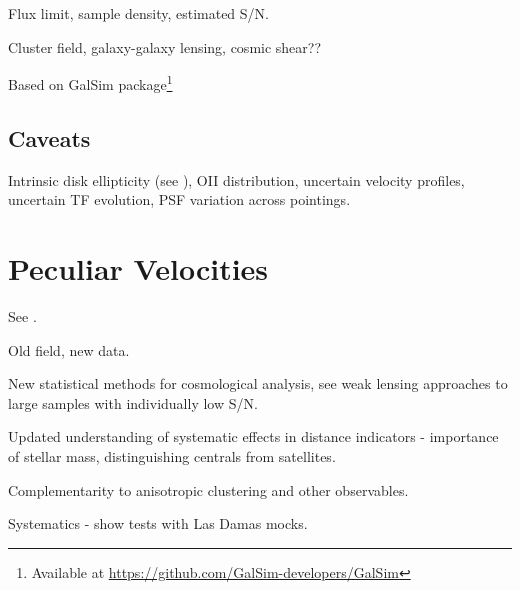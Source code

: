Flux limit, sample density, estimated S/N.

Cluster field, galaxy-galaxy lensing, cosmic shear??

Based on GalSim package\footnote{Available at \url{https://github.com/GalSim-developers/GalSim}}

\subsection{Caveats}

Intrinsic disk ellipticity (see \citealt{Franx1992, Franx1994}), OII
distribution, uncertain velocity profiles, uncertain TF evolution, PSF
variation across pointings.




\section{Peculiar Velocities}

See \citet{Koda2013}.

Old field, new data. 

New statistical methods for cosmological
analysis, see weak lensing approaches to large samples with
individually low S/N. 

Updated understanding of systematic effects in
distance indicators - importance of stellar mass, distinguishing
centrals from satellites.

Complementarity to anisotropic clustering and other observables.

Systematics - show tests with Las Damas mocks.
